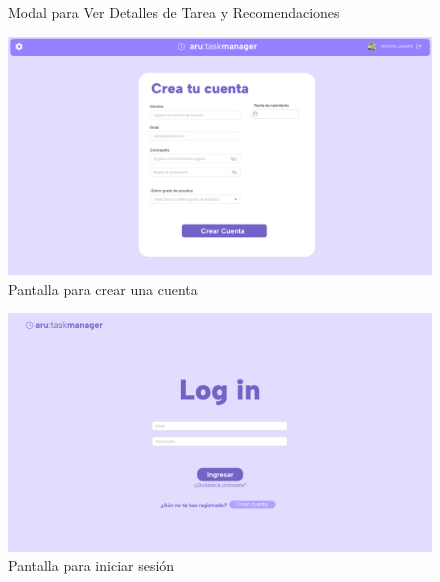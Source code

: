\documentclass{pretexto/report}
\begin{document}
\begin{figure}[H]
    \centering
    \caption{Modal para Ver Detalles de Tarea y Recomendaciones}
\end{figure}
\begin{figure}[H]
    \centering
    \includegraphics[width=\linewidth]{pantallas/register.png}
    \caption{Pantalla para crear una cuenta}
\end{figure}
\begin{figure}[H]
    \centering
    \includegraphics[width=\linewidth]{pantallas/login.png}
    \caption{Pantalla para iniciar sesión}
\end{figure}
\end{document}
